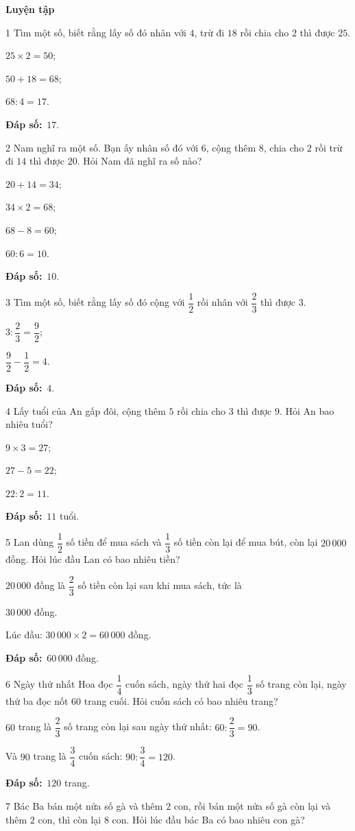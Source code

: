 \documentclass[11pt]{article}
\newif\ifsol \solfalse
\providecommand{\AnsWord}{Đáp số}
\newcommand{\dapso}[1]{\par\textbf{\AnsWord:}\ #1}
\newcommand{\probsol}[1]{%
  \begin{lrbox}{\solmeasure}\begin{minipage}{\dimexpr\linewidth-24pt\relax}#1\end{minipage}\end{lrbox}%
  \ifsol
    \begin{solbox}#1\end{solbox}%
  \else
    \setlength{\solht}{\dimexpr\ht\solmeasure+\dp\solmeasure+0.85cm\relax}%
    \ifdim\solht<1.35cm\setlength{\solht}{1.35cm}\fi
    \begin{tcolorbox}[colback=white,colframe=Line,boxrule=0.8pt,arc=5pt,
      left=8pt,right=8pt,top=4pt,bottom=4pt,height=\solht]{\footnotesize\color{Slate}\itshape\WorkWord}\end{tcolorbox}%
  \fi}
\newcommand{\dividerbar}[1]{\par\vspace{0.6em}\noindent
  \begin{tcolorbox}[enhanced,frame hidden,interior hidden,borderline west={5pt}{0pt}{ProbBlue},
    colback=white,left=12pt,right=12pt,top=5pt,bottom=5pt,arc=4pt]
  {\large\bfseries\color{ProbBlue} #1}\end{tcolorbox}\vspace{0.4em}}
\newcommand{\gap}{\vspace{0.3cm}}
\def\WorkWord{Bài làm:}
\def\AnsWord{Đáp số}
\begin{document}
\dividerbar{Luyện tập}
\begin{probbox}{1}{\relax}
Tìm một số, biết rằng lấy số đó nhân với $4$, trừ đi $18$ rồi chia cho $2$ thì được $25$.
\end{probbox}
\probsol{
$25\times2=50$;\par $50+18=68$;\par $68:4=17$.
\dapso{$17$.}}
\gap
\begin{probbox}{2}{\relax}
Nam nghĩ ra một số. Bạn ấy nhân số đó với $6$, cộng thêm $8$, chia cho $2$ rồi trừ đi $14$ thì được $20$. Hỏi Nam đã nghĩ ra số nào?
\end{probbox}
\probsol{
$20+14=34$;\par $34\times2=68$;\par $68-8=60$;\par $60:6=10$.
\dapso{$10$.}}
\gap
\begin{probbox}{3}{\relax}
Tìm một số, biết rằng lấy số đó cộng với $\dfrac12$ rồi nhân với $\dfrac23$ thì được $3$.
\end{probbox}
\probsol{
$3:\dfrac23=\dfrac92$;\par $\dfrac92-\dfrac12=4$.
\dapso{$4$.}}
\gap
\begin{probbox}{4}{\relax}
Lấy tuổi của An gấp đôi, cộng thêm $5$ rồi chia cho $3$ thì được $9$. Hỏi An bao nhiêu tuổi?
\end{probbox}
\probsol{
$9\times3=27$;\par $27-5=22$;\par $22:2=11$.
\dapso{$11$ tuổi.}}
\gap
\begin{probbox}{5}{\relax}
Lan dùng $\dfrac12$ số tiền để mua sách và $\dfrac13$ số tiền còn lại để mua bút, còn lại $20\,000$ đồng. Hỏi lúc đầu Lan có bao nhiêu tiền?
\end{probbox}
\probsol{
$20\,000$ đồng là $\dfrac23$ số tiền còn lại sau khi mua sách, tức là\par $30\,000$ đồng.\par Lúc đầu: $30\,000\times2=60\,000$ đồng.
\dapso{$60\,000$ đồng.}}
\gap
\begin{probbox}{6}{\relax}
Ngày thứ nhất Hoa đọc $\dfrac14$ cuốn sách, ngày thứ hai đọc $\dfrac13$ số trang còn lại, ngày thứ ba đọc nốt $60$ trang cuối. Hỏi cuốn sách có bao nhiêu trang?
\end{probbox}
\probsol{
$60$ trang là $\dfrac23$ số trang còn lại sau ngày thứ nhất: $60:\dfrac23=90$.\par Và $90$ trang là $\dfrac34$ cuốn sách: $90:\dfrac34=120$.
\dapso{$120$ trang.}}
\gap
\begin{probbox}{7}{\relax}
Bác Ba bán một nửa số gà và thêm $2$ con, rồi bán một nửa số gà còn lại và thêm $2$ con, thì còn lại $8$ con. Hỏi lúc đầu bác Ba có bao nhiêu con gà?
\end{probbox}
\end{document}
